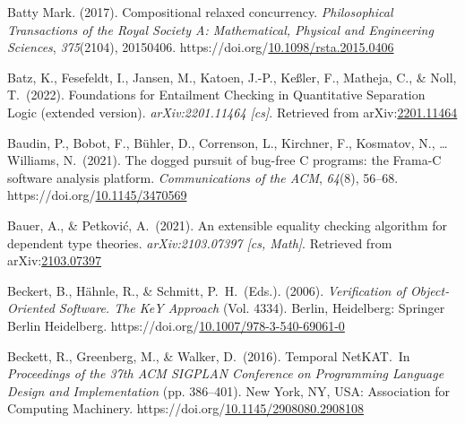 \documentclass[12pt,twoside]{article}
\begin{document}
{\begin{thebibliography}{1079}
\mdbibitemlabel{}Batty Mark. (2017). Compositional relaxed concurrency. \emph{Philosophical Transactions of the Royal Society A: Mathematical, Physical and Engineering Sciences}, \emph{375}(2104), 20150406. https://doi.org/\href{https://dx.doi.org/10.1098/rsta.2015.0406}{10.1098/rsta.2015.0406}%

\mdbibitemlabel{}Batz, K., Fesefeldt, I., Jansen, M., Katoen, J.-P., Keßler, F., Matheja, C., \& Noll, T.~(2022). Foundations for Entailment Checking in Quantitative Separation Logic (extended version). \emph{arXiv:2201.11464 {}[cs]}. Retrieved from arXiv:\href{http://arxiv.org/abs/2201.11464}{2201.11464}%

\mdbibitemlabel{}Baudin, P., Bobot, F., Bühler, D., Correnson, L., Kirchner, F., Kosmatov, N., … Williams, N.~(2021). The dogged pursuit of bug-free C programs: the Frama-C software analysis platform. \emph{Communications of the ACM}, \emph{64}(8), 56–68. https://doi.org/\href{https://dx.doi.org/10.1145/3470569}{10.1145/3470569}%

\mdbibitemlabel{}Bauer, A., \& Petković, A.~(2021). An extensible equality checking algorithm for dependent type theories. \emph{arXiv:2103.07397 {}[cs, Math]}. Retrieved from arXiv:\href{http://arxiv.org/abs/2103.07397}{2103.07397}%

\mdbibitemlabel{}Beckert, B., Hähnle, R., \& Schmitt, P.~H.~(Eds.). (2006). \emph{Verification of Object-Oriented Software. The KeY Approach} (Vol. 4334). Berlin, Heidelberg: Springer Berlin Heidelberg. https://doi.org/\href{https://dx.doi.org/10.1007/978-3-540-69061-0}{10.1007/978-3-540-69061-0}%

\mdbibitemlabel{}Beckett, R., Greenberg, M., \& Walker, D.~(2016). Temporal NetKAT.~In \emph{Proceedings of the 37th ACM SIGPLAN Conference on Programming Language Design and Implementation} (pp. 386–401). New York, NY, USA: Association for Computing Machinery. https://doi.org/\href{https://dx.doi.org/10.1145/2908080.2908108}{10.1145/2908080.2908108}%


\end{thebibliography}}
\end{document}
